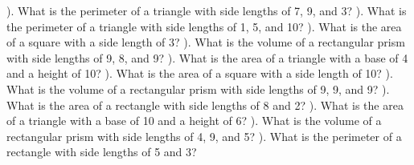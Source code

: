 \documentclass{article}%
\begin{document}
\newline%
\newline%
). What is the perimeter of a triangle with side lengths of 7, 9, and 3?%
\newline%
\newline%
). What is the perimeter of a triangle with side lengths of 1, 5, and 10?%
\newline%
\newline%
). What is the area of a square with a side length of 3?%
\newline%
\newline%
). What is the volume of a rectangular prism with side lengths of 9, 8, and 9?%
\newline%
\newline%
). What is the area of a triangle with a base of 4 and a height of 10?%
\newline%
\newline%
). What is the area of a square with a side length of 10?%
\newline%
\newline%
). What is the volume of a rectangular prism with side lengths of 9, 9, and 9?%
\newline%
\newline%
). What is the area of a rectangle with side lengths of 8 and 2?%
\newline%
\newline%
). What is the area of a triangle with a base of 10 and a height of 6?%
\newline%
\newline%
). What is the volume of a rectangular prism with side lengths of 4, 9, and 5?%
\newline%
\newline%
). What is the perimeter of a rectangle with side lengths of 5 and 3?%
\newline%
\newline%
\newline%
\end{document}
